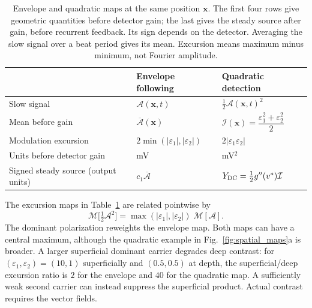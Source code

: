 \documentclass[a4paper]{article}
\begin{document}
\begin{table}[ht]
\centering\small
\renewcommand{\arraystretch}{1.4}
\begin{tabular}{@{}>{\raggedright\arraybackslash}p{}
 >{\raggedright\arraybackslash}p{}
 >{\raggedright\arraybackslash}p{}@{}}
\toprule
 & Envelope following & Quadratic detection \\
\midrule
Slow signal & $\mathcal A(\mathbf x,t)$ & $\tfrac12\mathcal A(\mathbf x,t)^2$ \\
Mean before gain & $\overline{\mathcal A}(\mathbf x)$
 & $\mathcal I(\mathbf x)=\dfrac{\varepsilon_1^2+\varepsilon_2^2}{2}$ \\
Modulation excursion & $2\min(|\varepsilon_1|,|\varepsilon_2|)$
 & $2|\varepsilon_1\varepsilon_2|$ \\
Units before detector gain & mV & mV$^2$ \\
Signed steady source (output units) & $c_1\overline{\mathcal A}$
 & $Y_{\rm DC}=\tfrac12g''(v^*)\mathcal I$ \\
\bottomrule
\end{tabular}
\caption{Envelope and quadratic maps at the same position $\mathbf x$.
The first four rows give geometric quantities before detector gain; the last
gives the steady source after gain, before recurrent feedback. Its sign depends
on the detector. Averaging the slow signal over a beat period gives its mean.
Excursion means maximum minus minimum, not Fourier amplitude.}
\label{tab:transduction-maps}
\end{table}

The excursion maps in Table~\ref{tab:transduction-maps} are related pointwise by
\begin{equation}
\mathcal{M}\big[\tfrac12\mathcal A^2\big]=\max(|\varepsilon_1|,|\varepsilon_2|)\;\mathcal{M}[\mathcal A].
\label{eq:reweight}
\end{equation}
The dominant polarization reweights the envelope map. Both maps can have a
central maximum, although the quadratic example in Fig.~\ref{fig:spatial_maps}a
is broader. A larger superficial dominant carrier degrades deep contrast:
for $(\varepsilon_1,\varepsilon_2)=(10,1)$ superficially and $(0.5,0.5)$
at depth, the superficial/deep excursion ratio is $2$ for the envelope
and $40$ for the quadratic map. A sufficiently weak second carrier can
instead suppress the superficial product. Actual contrast requires the vector fields.
\end{document}
